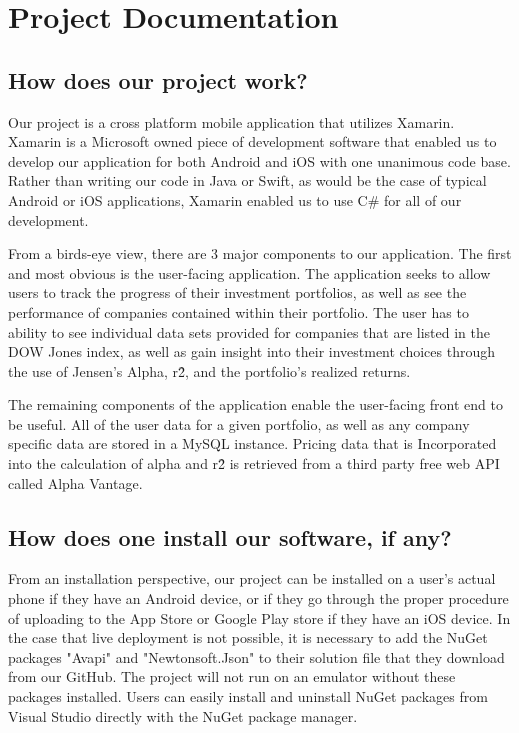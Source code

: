 \documentclass[onecolumn, draftclsnofoot,10pt, compsoc]{IEEEtran}
\begin{document}
\newpage
\section{Project Documentation}
\subsection{How does our project work?}
Our project is a cross platform mobile application that utilizes Xamarin. Xamarin is a Microsoft owned piece of development software that enabled us to develop our application for both Android and iOS with one unanimous code base. Rather than writing our code in Java or Swift, as would be the case of typical Android or iOS applications, Xamarin enabled us to use C\# for all of our development.

From a birds-eye view, there are 3 major components to our application. The first and most obvious is the user-facing application. The application seeks to allow users to track the progress of their investment portfolios, as well as see the performance of companies contained within their portfolio. The user has to ability to see individual data sets provided for companies that are listed in the DOW Jones index, as well as gain insight into their investment choices through the use of Jensen's Alpha, r\^2, and the portfolio's realized returns.

The remaining components of the application enable the user-facing front end to be useful. All of the user data for a given portfolio, as well as any company specific data are stored in a MySQL instance. Pricing data that is Incorporated into the calculation of alpha and r\^2 is retrieved from a third party free web API called Alpha Vantage. 


\subsection{How does one install our software, if any?}
From an installation perspective, our project can be installed on a user's actual phone if they have an Android device, or if they go through the proper procedure of uploading to the App Store or Google Play store if they have an iOS device. In the case that live deployment is not possible, it is necessary to add the NuGet packages "Avapi" and "Newtonsoft.Json" to their solution file that they download from our GitHub. The project will not run on an emulator without these packages installed. Users can easily install and uninstall NuGet packages from Visual Studio directly with the NuGet package manager.
\end{document}
